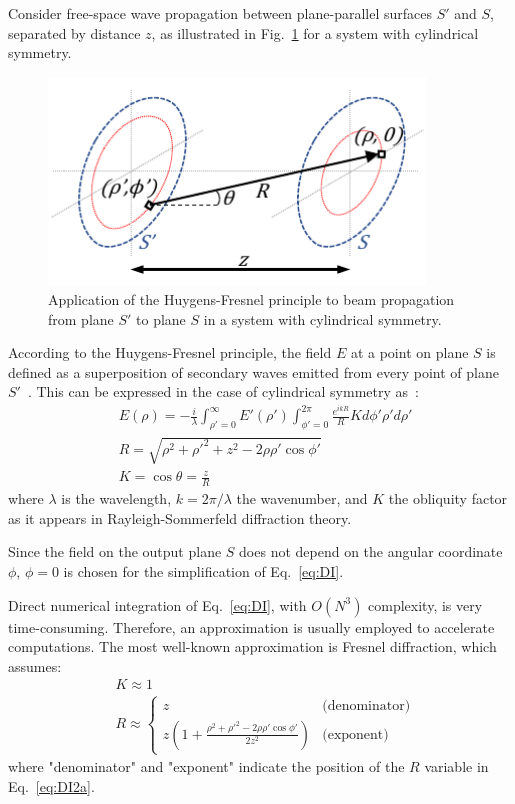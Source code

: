 Consider free-space wave propagation between plane-parallel surfaces \(S'\) and \(S\), separated by distance \(z\), as illustrated in Fig.~\ref{fig:diffraction} for a system with cylindrical symmetry.
\begin{figure}[ht] 
 \centering
 \includegraphics[width=10cm]{images/diffraction.pdf}
 \caption{Application of the Huygens-Fresnel principle to beam propagation from plane \(S'\) to plane \(S\) in a system with cylindrical symmetry.}
 \label{fig:diffraction}
\end{figure}
According to the Huygens-Fresnel principle, the field \(E\) at a point on plane \(S\) is defined as a superposition of secondary waves emitted from every point of plane \(S'\)~\cite{BornWolf-1999}. This can be expressed in the case of cylindrical symmetry as~\cite{Siegman-1986,PeatrossWare-2015}:
\begin{subequations} \label{eq:DI}
 \begin{align}
  &E(\rho) = -\frac{i}{\lambda} \int_{\rho'=0}^{\infty} E'(\rho') \int_{\phi'=0}^{2\pi} \frac{e^{ikR}}{R} K d\phi' \rho' d\rho' \label{eq:DI2a}\\
  &R = \sqrt{\rho^2 + \rho'^2 + z^2 - 2\rho\rho'\cos\phi'} \label{eq:DI2b}\\
  &K = \cos\theta = \frac{z}{R} \label{eq:DI2c}
 \end{align}
\end{subequations}
where \(\lambda\) is the wavelength, \(k = 2\pi / \lambda\) the wavenumber, and \(K\) the obliquity factor as it appears in Rayleigh-Sommerfeld diffraction theory.

Since the field on the output plane \(S\) does not depend on the angular coordinate \(\phi\), \(\phi = 0\) is chosen for the simplification of Eq.~\ref{eq:DI}.

Direct numerical integration of Eq.~\ref{eq:DI}, with \(O(N^3)\) complexity, is very time-consuming. Therefore, an approximation is usually employed to accelerate computations. The most well-known approximation is Fresnel diffraction, which assumes:
\begin{equation} \label{eq:FreA}
 \begin{split}
  &K \approx 1\\
  &R \approx
  \begin{cases}
   z & \text{(denominator)}\\
   z \left(1 + \frac{\rho^2 + \rho'^2 - 2\rho\rho'\cos\phi'}{2z^2}\right) & \text{(exponent)}
  \end{cases}
 \end{split}
\end{equation}
where "denominator" and "exponent" indicate the position of the \(R\) variable in Eq.~\ref{eq:DI2a}.

